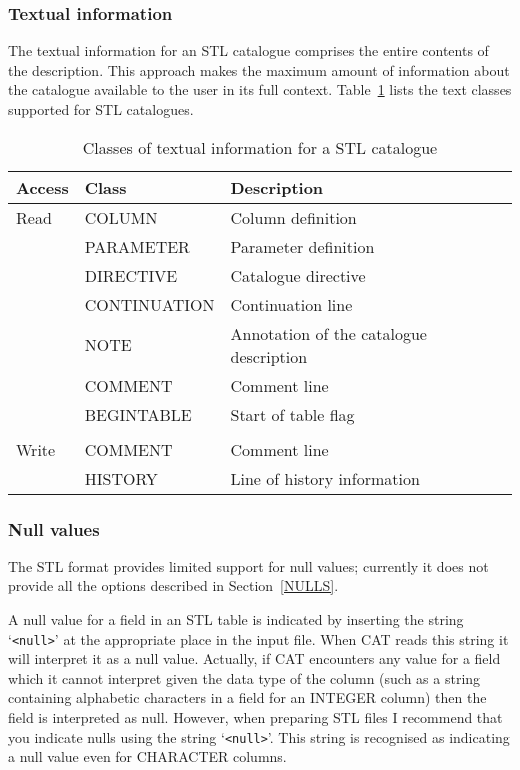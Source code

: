 \documentclass[11pt,twoside]{starlink}
\begin{document}
\subsubsection{Textual information}

The textual information for an STL catalogue comprises the entire contents
of the description. This approach makes the maximum amount of information
about the catalogue available to the user in its full context.
Table~\ref{STL_TEXT} lists the text classes supported for STL catalogues.

\begin{table}[htbp]

\begin{center}
\begin{tabular}{lll}
Access & Class        & Description   \\ \hline
Read   & COLUMN       & Column definition \\
       & PARAMETER    & Parameter definition \\
       & DIRECTIVE    & Catalogue directive \\
       & CONTINUATION & Continuation line \\
       & NOTE         & Annotation of the catalogue description \\
       & COMMENT      & Comment line  \\
       & BEGINTABLE   & Start of table flag \\
       &              & \\
Write  & COMMENT      & Comment line  \\
       & HISTORY      & Line of history information \\
\end{tabular}
\end{center}

\caption{\label{STL_TEXT}Classes of textual information for a STL
catalogue}

\end{table}

\subsubsection{Null values}

The STL format provides limited support for null values; currently it
does not provide all the options described in Section~\ref{NULLS}.

A null value for a field in an STL table is indicated by inserting
the string `\verb-<null>-' at the appropriate place in the input file.
When CAT reads this string it will interpret it as a null value.
Actually, if CAT encounters any value for a field which it cannot
interpret given the data type of the column (such as a string containing
alphabetic characters in a field for an INTEGER column) then the field
is interpreted as null.  However, when preparing STL files I recommend
that you indicate nulls using the string `\verb-<null>-'.  This string
is recognised as indicating a null value even for CHARACTER columns.
\end{document}
